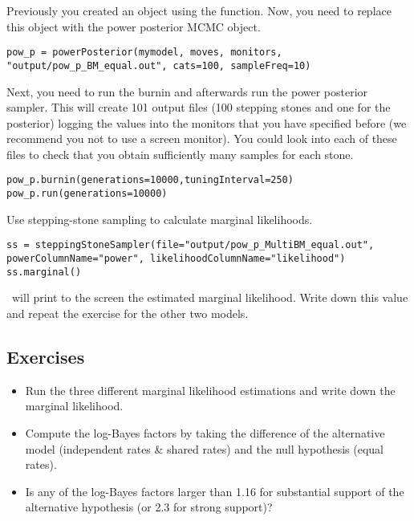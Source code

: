 Previously you created an  object using the  function. Now, you need to replace this object with the power posterior MCMC object.
{\tt \small \begin{snugshade*}
\begin{lstlisting}
pow_p = powerPosterior(mymodel, moves, monitors, "output/pow_p_BM_equal.out", cats=100, sampleFreq=10) 
\end{lstlisting}
\end{snugshade*}}
Next, you need to run the burnin and afterwards run the power posterior sampler. This will create 101 output files (100 stepping stones and one for the posterior) logging the values into the monitors that you have specified before (we recommend you not to use a screen monitor). You could look into each of these files to check that you obtain sufficiently many samples for each stone.
{\tt \small \begin{snugshade*}
\begin{lstlisting}
pow_p.burnin(generations=10000,tuningInterval=250)
pow_p.run(generations=10000)  
\end{lstlisting}
\end{snugshade*}}
Use stepping-stone sampling to calculate marginal likelihoods.
{\tt \small \begin{snugshade*}
\begin{lstlisting}
ss = steppingStoneSampler(file="output/pow_p_MultiBM_equal.out", powerColumnName="power", likelihoodColumnName="likelihood")
ss.marginal() 
\end{lstlisting}
\end{snugshade*}}
\RevBayes~will print to the screen the estimated marginal likelihood. Write down this value and repeat the exercise for the other two models.



\subsection*{Exercises}

\begin{itemize}
\item
Run the three different marginal likelihood estimations and write down the marginal likelihood.
\item
Compute the log-Bayes factors by taking the difference of the alternative model (independent rates \& shared rates) and the null hypothesis (equal rates).
\item
Is any of the log-Bayes factors larger than 1.16 for substantial support of the alternative hypothesis (or 2.3 for strong support)?
\end{itemize}

